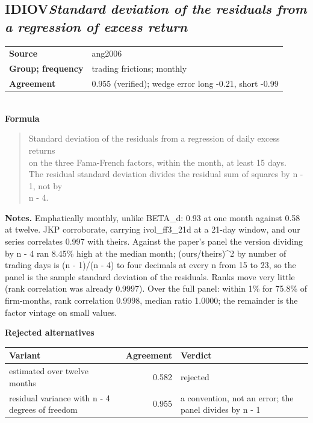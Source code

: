 \documentclass[11pt]{article}
\begin{document}
\subsection*{IDIOV\quad\normalfont\itshape Standard deviation of the residuals from a regression of excess return}
\begin{tabular}{@{}p{3.3cm}p{12.3cm}@{}}
\textbf{Source} & ang2006\\
\textbf{Group; frequency} & trading frictions; monthly\\
\textbf{Agreement} & 0.955 (verified); wedge error long -0.21, short -0.99\\
\end{tabular}\\[4pt]
\textbf{Formula}
\begin{quote}\small
Standard deviation of the residuals from a regression of daily excess returns\\
on the three Fama-French factors, within the month, at least 15 days.\\
The residual standard deviation divides the residual sum of squares by n - 1, not by\\
n - 4.\\

\end{quote}
\textbf{Notes.} Emphatically monthly, unlike BETA\_d: 0.93 at one month against 0.58 at twelve. JKP corroborate, carrying ivol\_ff3\_21d at a 21-day window, and our series correlates 0.997 with theirs. Against the paper's panel the version dividing by n - 4 ran 8.45\% high at the median month; (ours/theirs)\textasciicircum{}2 by number of trading days is (n - 1)/(n - 4) to four decimals at every n from 15 to 23, so the panel is the sample standard deviation of the residuals. Ranks move very little (rank correlation was already 0.9997). Over the full panel: within 1\% for 75.8\% of firm-months, rank correlation 0.9998, median ratio 1.0000; the remainder is the factor vintage on small values.

\textbf{Rejected alternatives}\\[2pt]
{\small\begin{longtable}{@{}p{9.6cm}rp{4.3cm}@{}}
\toprule Variant & Agreement & Verdict\\\midrule\endhead
estimated over twelve months & 0.582 & rejected\\
residual variance with n - 4 degrees of freedom & 0.955 & a convention, not an error; the panel divides by n - 1\\
\bottomrule\end{longtable}}
\end{document}
